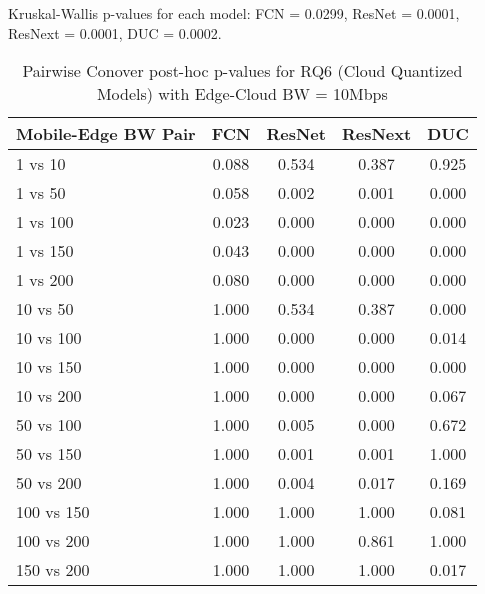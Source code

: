 \begin{table}[h]
\centering
\caption{Pairwise Conover post-hoc p-values for RQ6 (Cloud Quantized Models) with Edge-Cloud BW = 10Mbps}
\label{tab:conover_cloud_quantized_ec10}
\smallskip
Kruskal-Wallis p-values for each model: FCN = 0.0299, ResNet = 0.0001, ResNext = 0.0001, DUC = 0.0002.

\begin{tabular}{lcccc}
\toprule
Mobile-Edge BW Pair & FCN & ResNet & ResNext & DUC \\
\midrule
1 vs 10 & 0.088 & 0.534 & 0.387 & 0.925 \\
1 vs 50 & 0.058 & 0.002 & 0.001 & 0.000 \\
1 vs 100 & 0.023 & 0.000 & 0.000 & 0.000 \\
1 vs 150 & 0.043 & 0.000 & 0.000 & 0.000 \\
1 vs 200 & 0.080 & 0.000 & 0.000 & 0.000 \\
10 vs 50 & 1.000 & 0.534 & 0.387 & 0.000 \\
10 vs 100 & 1.000 & 0.000 & 0.000 & 0.014 \\
10 vs 150 & 1.000 & 0.000 & 0.000 & 0.000 \\
10 vs 200 & 1.000 & 0.000 & 0.000 & 0.067 \\
50 vs 100 & 1.000 & 0.005 & 0.000 & 0.672 \\
50 vs 150 & 1.000 & 0.001 & 0.001 & 1.000 \\
50 vs 200 & 1.000 & 0.004 & 0.017 & 0.169 \\
100 vs 150 & 1.000 & 1.000 & 1.000 & 0.081 \\
100 vs 200 & 1.000 & 1.000 & 0.861 & 1.000 \\
150 vs 200 & 1.000 & 1.000 & 1.000 & 0.017 \\
\bottomrule
\end{tabular}
\end{table}

